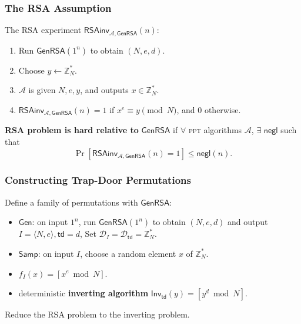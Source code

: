\begin{frame}\frametitle{The RSA Assumption}
The RSA experiment $\mathsf{RSAinv}_{\mathcal{A},\mathsf{GenRSA}}(n)$:
\begin{enumerate}
\item Run $\mathsf{GenRSA}(1^n)$ to obtain $(N,e,d)$.
\item Choose $y \gets \mathbb{Z}^*_N$.
\item $\mathcal{A}$ is given $N,e,y$, and outputs $x \in \mathbb{Z}^*_N$.
\item $\mathsf{RSAinv}_{\mathcal{A},\mathsf{GenRSA}}(n)=1$ if $x^e \equiv y \pmod N$, and 0 otherwise.
\end{enumerate}
\begin{definition}
\textbf{RSA problem is hard relative to} $\mathsf{GenRSA}$ if $\forall$ \textsc{ppt} algorithms $\mathcal{A}$, $\exists$ $\mathsf{negl}$ such that
\[ \Pr[\mathsf{RSAinv}_{\mathcal{A},\mathsf{GenRSA}}(n) = 1] \le \mathsf{negl}(n).\]
\end{definition}
\end{frame}
\begin{frame}\frametitle{Constructing Trap-Door Permutations}
\begin{construction}
Define a family of permutations with $\mathsf{GenRSA}$:
\begin{itemize}
\item $\mathsf{Gen}$: on input $1^n$, run $\mathsf{GenRSA}(1^n)$ to obtain $(N,e,d)$ and output $I=\langle N,e \rangle, \mathsf{td}=d$, Set $\mathcal{D}_I = \mathcal{D}_{\mathsf{td}} = \mathbb{Z}^*_N$.
\item $\mathsf{Samp}$: on input $I$, choose a random element $x$ of $\mathbb{Z}^*_N$.
\item $f_{I}(x) = [ x^e \bmod N]$.
\item deterministic \textbf{inverting algorithm} $\mathsf{Inv}_{\mathsf{td}}(y) = [ y^d \bmod N]$.
\end{itemize}
\end{construction}
Reduce the RSA problem to the inverting problem.
\end{frame}
